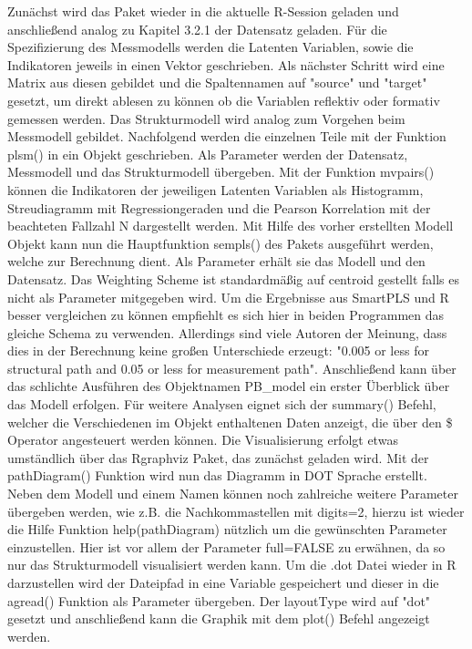\documentclass{article}\usepackage[]{graphicx}\usepackage[]{color}
\begin{document}
Zunächst wird das Paket wieder in die aktuelle R-Session geladen und anschließend analog zu Kapitel 3.2.1 der Datensatz geladen. Für die Spezifizierung des Messmodells werden die Latenten Variablen, sowie die Indikatoren jeweils in einen Vektor geschrieben. Als nächster Schritt wird eine Matrix aus diesen gebildet und die Spaltennamen auf "source" und "target" gesetzt, um direkt ablesen zu können ob die Variablen reflektiv oder formativ gemessen werden. Das Strukturmodell wird analog zum Vorgehen beim Messmodell gebildet. Nachfolgend werden die einzelnen Teile mit der Funktion plsm() in ein Objekt geschrieben. Als Parameter werden der Datensatz, Messmodell und das Strukturmodell übergeben. Mit der Funktion mvpairs() können die Indikatoren der jeweiligen Latenten Variablen als Histogramm, Streudiagramm mit Regressiongeraden und die Pearson Korrelation mit der beachteten Fallzahl N dargestellt werden. Mit Hilfe des vorher erstellten Modell Objekt kann nun die Hauptfunktion sempls() des Pakets ausgeführt werden, welche zur Berechnung dient. Als Parameter erhält sie das Modell und den Datensatz. Das Weighting Scheme ist standardmäßig auf centroid gestellt falls es nicht als Parameter mitgegeben wird. Um die Ergebnisse aus SmartPLS und R besser vergleichen zu können empfiehlt es sich hier in beiden Programmen das gleiche Schema zu verwenden. Allerdings sind viele Autoren der Meinung, dass dies in der Berechnung keine großen Unterschiede erzeugt: "0.005 or less for structural path and 0.05 or less for measurement path".\cite{noonan1982pls} Anschließend kann über das schlichte Ausführen des Objektnamen PB\_model ein erster Überblick über das Modell erfolgen. Für weitere Analysen eignet sich der summary() Befehl, welcher die Verschiedenen im Objekt enthaltenen Daten anzeigt, die über den \$ Operator angesteuert werden können. Die Visualisierung erfolgt etwas umständlich über das Rgraphviz Paket, das zunächst geladen wird. Mit der pathDiagram() Funktion wird nun das Diagramm in DOT Sprache erstellt. Neben dem Modell und einem Namen können noch zahlreiche weitere Parameter übergeben werden, wie z.B. die Nachkommastellen mit digits=2, hierzu ist wieder die Hilfe Funktion help(pathDiagram) nützlich um die gewünschten Parameter einzustellen. Hier ist vor allem der Parameter full=FALSE zu erwähnen, da so nur das Strukturmodell visualisiert werden kann. Um die .dot Datei wieder in R darzustellen wird der Dateipfad in eine Variable gespeichert und dieser in die agread() Funktion als Parameter übergeben. Der layoutType wird auf "dot" gesetzt und anschließend kann die Graphik mit dem plot() Befehl angezeigt werden.\\
\end{document}
